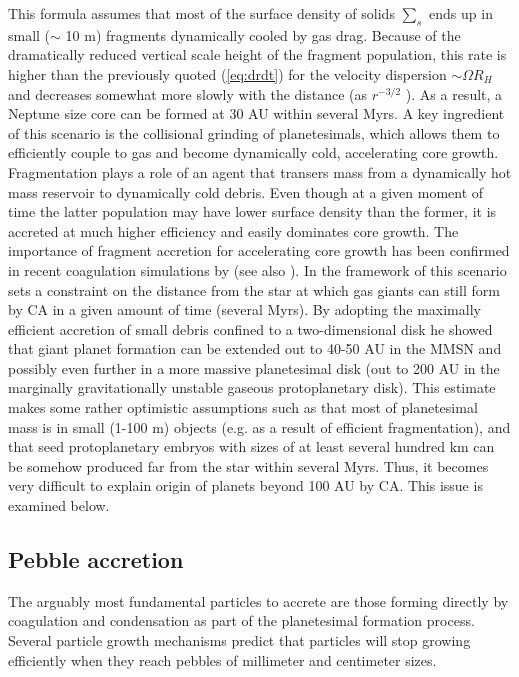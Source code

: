 This formula assumes that most of the surface density of solids $\sum_s$ ends up in small ($\sim$ 10 m) fragments dynamically
cooled by gas drag. Because of the dramatically reduced vertical scale height of the fragment population, this rate
is higher than the previously quoted (\ref{eq:drdt}) for the velocity dispersion $\sim  \Omega R_ H$ and decreases somewhat more slowly
with the distance (as $r^{−3/2}$ ). As a result, a Neptune size core can be formed at 30 AU within several Myrs.
A key ingredient of this scenario is the collisional grinding of planetesimals, which allows them to efficiently 
couple to gas and become dynamically cold, accelerating core growth. Fragmentation plays a role of an agent that transers 
mass from a dynamically hot mass reservoir 
to dynamically cold debris. Even though at a given moment of time the latter population may
have lower surface density than the former, it is accreted at much higher efficiency and easily dominates core growth.
The importance of fragment accretion for accelerating core growth has been confirmed in recent coagulation simulations 
by \cite{Kenyon2009} (see also \cite{Levison2010}).
In the framework of this scenario \cite{Rafikov2011} sets a constraint on the distance from the star at which gas giants
can still form by CA in a given amount of time (several Myrs). By adopting the maximally efficient accretion of
small debris confined to a two-dimensional disk he showed that giant planet formation can be extended out to 40-50 AU
in the MMSN and possibly even further in a more massive planetesimal disk (out to 200 AU in the marginally gravitationally 
unstable gaseous protoplanetary disk). This estimate makes some rather optimistic assumptions such as
that most of planetesimal mass is in small (1-100 m) objects (e.g. as a result of efficient fragmentation), and that
seed protoplanetary embryos with sizes of at least several hundred km can be somehow produced far from the star
within several Myrs. Thus, it becomes very difficult to explain origin of planets beyond 100 AU by CA. This issue is
examined below.

\subsection{Pebble accretion}
\label{ss_pebble}

The arguably most fundamental particles to accrete are those forming directly by coagulation and condensation as
part of the planetesimal formation process. Several particle growth mechanisms predict that particles will stop growing
efficiently when they reach pebbles of millimeter and centimeter sizes.

